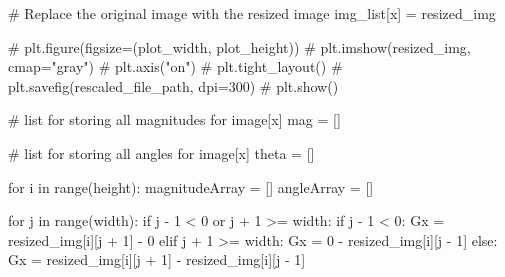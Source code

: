 \documentclass[
  letterpaper,
  DIV=11,
  numbers=noendperiod]{scrreprt}
\newenvironment{Shaded}{\begin{snugshade}}{\end{snugshade}}
\newcommand{\BuiltInTok}[1]{\textcolor[rgb]{0.00,0.23,0.31}{#1}}
\newcommand{\CommentTok}[1]{\textcolor[rgb]{0.37,0.37,0.37}{#1}}
\newcommand{\ControlFlowTok}[1]{\textcolor[rgb]{0.00,0.23,0.31}{#1}}
\newcommand{\DecValTok}[1]{\textcolor[rgb]{0.68,0.00,0.00}{#1}}
\newcommand{\KeywordTok}[1]{\textcolor[rgb]{0.00,0.23,0.31}{#1}}
\newcommand{\NormalTok}[1]{\textcolor[rgb]{0.00,0.23,0.31}{#1}}
\newcommand{\OperatorTok}[1]{\textcolor[rgb]{0.37,0.37,0.37}{#1}}
\begin{document}
\begin{Shaded}
\begin{Highlighting}[]
    \CommentTok{\# Replace the original image with the resized image}
\NormalTok{    img\_list[x] }\OperatorTok{=}\NormalTok{ resized\_img}
    
    \CommentTok{\# plt.figure(figsize=(plot\_width, plot\_height))}
    \CommentTok{\# plt.imshow(resized\_img, cmap="gray")}
    \CommentTok{\# plt.axis("on")}
    \CommentTok{\# plt.tight\_layout()}
    \CommentTok{\# plt.savefig(rescaled\_file\_path, dpi=300)}
    \CommentTok{\# plt.show()}

    
    \CommentTok{\# list for storing all magnitudes for image[x]}
\NormalTok{    mag }\OperatorTok{=}\NormalTok{ []}
    
    \CommentTok{\# list for storing all angles for image[x]}
\NormalTok{    theta }\OperatorTok{=}\NormalTok{ []}
    
    \ControlFlowTok{for}\NormalTok{ i }\KeywordTok{in} \BuiltInTok{range}\NormalTok{(height):}
\NormalTok{        magnitudeArray }\OperatorTok{=}\NormalTok{ []}
\NormalTok{        angleArray }\OperatorTok{=}\NormalTok{ []}

        \ControlFlowTok{for}\NormalTok{ j }\KeywordTok{in} \BuiltInTok{range}\NormalTok{(width):}
            \ControlFlowTok{if}\NormalTok{ j }\OperatorTok{{-}} \DecValTok{1} \OperatorTok{\textless{}} \DecValTok{0} \KeywordTok{or}\NormalTok{ j }\OperatorTok{+} \DecValTok{1} \OperatorTok{\textgreater{}=}\NormalTok{ width:}
                \ControlFlowTok{if}\NormalTok{ j }\OperatorTok{{-}} \DecValTok{1} \OperatorTok{\textless{}} \DecValTok{0}\NormalTok{:}
\NormalTok{                    Gx }\OperatorTok{=}\NormalTok{ resized\_img[i][j }\OperatorTok{+} \DecValTok{1}\NormalTok{] }\OperatorTok{{-}} \DecValTok{0}
                \ControlFlowTok{elif}\NormalTok{ j }\OperatorTok{+} \DecValTok{1} \OperatorTok{\textgreater{}=}\NormalTok{ width:}
\NormalTok{                    Gx }\OperatorTok{=} \DecValTok{0} \OperatorTok{{-}}\NormalTok{ resized\_img[i][j }\OperatorTok{{-}} \DecValTok{1}\NormalTok{]}
            \ControlFlowTok{else}\NormalTok{:}
\NormalTok{                Gx }\OperatorTok{=}\NormalTok{ resized\_img[i][j }\OperatorTok{+} \DecValTok{1}\NormalTok{] }\OperatorTok{{-}}\NormalTok{ resized\_img[i][j }\OperatorTok{{-}} \DecValTok{1}\NormalTok{]}


\end{Highlighting}
\end{Shaded}
\end{document}
